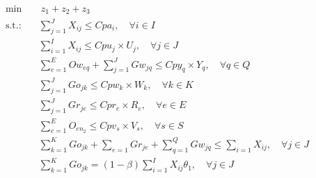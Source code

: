 \documentclass[a4paper]{ifacconf}
\begin{document}
\begin{align}
    \min &\ z_1 + z_2 + z_3 \label{eq:custo}\\
    \text{s.t.:} \quad & \sum\limits_{j=1}^J X_{ij} \le Cpa_i, \quad \forall i \in I \label{eq:restricao1}\\
    & \sum\limits_{i=1}^I X_{ij} \le Cpu_j\times U_j, \quad \forall j \in J \label{eq:restricao2}\\
    & \sum\limits_{e=1}^E Ow_{eq} + \sum\limits_{j=1}^J Gw_{jq} \le Cpy_q \times Y_q, \quad \forall q \in Q \label{eq:restricao3}\\
    & \sum\limits_{j=1}^J Go_{jk} \le Cpw_k\times W_k, \quad \forall k \in K \label{eq:restricao4}\\
    & \sum\limits_{j=1}^J Gr_{je} \le Cpr_e\times R_e, \quad \forall e \in E \label{eq:restricao5}\\
    & \sum\limits_{e=1}^E O_{en_2} \le Cpv_s\times V_s, \quad \forall s \in S \label{eq:restricao6}\\
    & \sum\limits_{k=1}^K Go_{jk} + \sum\limits_{e=1} Gr_{je} + \sum\limits_{q=1}^Q Gw_{jq} \le \sum\limits_{i=1} X_{ij}, \quad \forall j \in J \label{eq:restricao7} \\
    & \sum\limits_{k=1}^K Go_{jk} = (1-\beta) \sum\limits_{i=1}^I X_{ij}\theta_1, \quad \forall j\in J \label{eq:restricao8}
\end{align}
\end{document}
